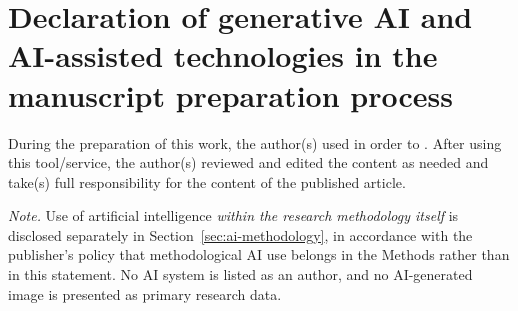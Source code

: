 \section*{Declaration of generative AI and AI-assisted technologies in the manuscript preparation process}

During the preparation of this work, the author(s) used
 in order to
. After using
this tool/service, the author(s) reviewed and edited the content as needed and
take(s) full responsibility for the content of the published article.

\medskip
\noindent\emph{Note.} Use of artificial intelligence \emph{within the research
methodology itself} is disclosed separately in
Section~\ref{sec:ai-methodology}, in accordance with the publisher's policy that
methodological AI use belongs in the Methods rather than in this statement. No
AI system is listed as an author, and no AI-generated image is presented as
primary research data.
